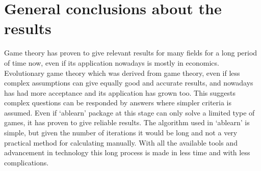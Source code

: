 \label{ch:conclusions}

\section{General conclusions about the results}
Game theory has proven to give relevant results for many fields for a long period of time now, even if its application nowadays is mostly in economics. Evolutionary game theory which was derived from game theory, even if less complex assumptions can give equally good and accurate results, and nowadays has had more acceptance  and its application has grown too. This suggests  complex questions can be responded by answers where simpler criteria is assumed.  Even if `ablearn' package at this stage can only solve a limited type of games, it has proven to give reliable results.   The algorithm used in `ablearn' is simple, but given the number of iterations it would be long and not a very practical method for calculating manually. With all the available tools and advancement in technology this long process is made in less time and with less complications. 
